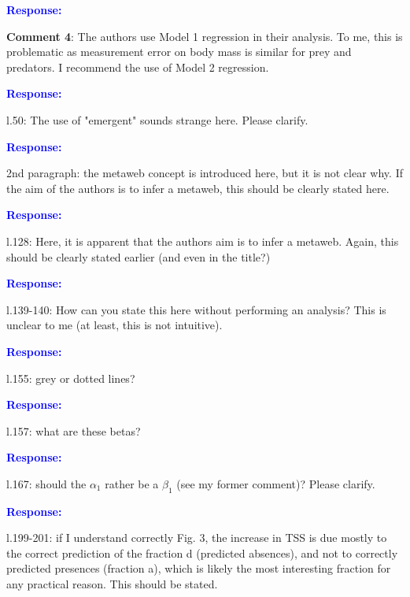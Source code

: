 \documentclass [12pt,onecolumn,twoside,openright]{report}
\begin{document}
\begin{onehalfspacing}
\medskip \textcolor{blue}{\textbf{Response:}} \textit{\textcolor{blue}{}}

\medskip \textbf{Comment 4}: The authors use Model 1
regression in their analysis. To me, this is problematic as measurement error on
body mass is similar for prey and predators. I recommend the use of Model 2
regression.

\medskip \textcolor{blue}{\textbf{Response:}} \textit{\textcolor{blue}{}}

\medskip l.50: The use of "emergent" sounds strange here.
Please clarify.

\textcolor{blue}{\textbf{Response:}} \textit{\textcolor{blue}{}}

\medskip 2nd paragraph: the metaweb concept is introduced
here, but it is not clear why. If the aim of the authors is to infer a metaweb,
this should be clearly stated here.

\textcolor{blue}{\textbf{Response:}} \textit{\textcolor{blue}{}}

\medskip l.128: Here, it is apparent that the authors aim is
to infer a metaweb. Again, this should be clearly stated earlier (and even in
the title?)

\textcolor{blue}{\textbf{Response:}} \textit{\textcolor{blue}{}}

\medskip l.139-140: How can you state this here without
performing an analysis? This is unclear to me (at least, this is not intuitive).


\textcolor{blue}{\textbf{Response:}} \textit{\textcolor{blue}{}}

\medskip l.155: grey or dotted lines?

\textcolor{blue}{\textbf{Response:}} \textit{\textcolor{blue}{}}

\medskip l.157: what are these betas?

\textcolor{blue}{\textbf{Response:}} \textit{\textcolor{blue}{}}

\medskip l.167: should the $\alpha_1$ rather be a $\beta_1$
(see my former comment)? Please clarify.


\textcolor{blue}{\textbf{Response:}} \textit{\textcolor{blue}{}}

\medskip l.199-201: if I understand correctly Fig. 3, the
increase in TSS is due mostly to the correct prediction of the fraction d
(predicted absences), and not to correctly predicted presences (fraction a),
which is likely the most interesting fraction for any practical reason. This
should be stated.


\end{onehalfspacing}
\end{document}
